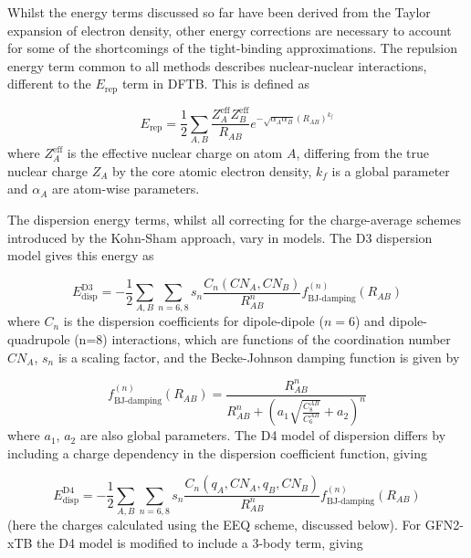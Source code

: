 Whilst the energy terms discussed so far have been derived from the Taylor expansion
of electron density, other energy corrections are necessary to account for some 
of the shortcomings of the tight-binding approximations. The repulsion energy term
common to all methods describes nuclear-nuclear interactions,
different to the $E_{\text{rep}}$ term in DFTB. This is defined as

\begin{equation}
    E_{\text{rep}} = \frac{1}{2}\sum_{A,B} \frac{Z^{\text{eff}}_A Z^{\text{eff}}_B}{R_{AB}} e^{-\sqrt{\alpha_A \alpha_B} \left(R_{AB}\right)^{k_f}}
\end{equation}
%
where $Z^{\text{eff}}_A$ is the effective nuclear charge on atom $A$, differing 
from the true nuclear charge $Z_A$ by the core atomic electron density, $k_f$ is
a global parameter and $\alpha_A$ are atom-wise parameters.

The dispersion energy terms, whilst all correcting for the charge-average schemes
introduced by the Kohn-Sham approach, vary in models. The D3 dispersion model gives
this energy as

\begin{equation}
    E^{\text{D3}}_\text{disp} = -\frac{1}{2}\sum_{A,B}\sum_{n=6,8} s_n \frac{C_n\left(CN_A, CN_B\right)}{R^n_{AB}} f^{\left(n\right)}_{\text{BJ-damping}} \left(R_{AB}\right)
\end{equation}
%
where $C_n$ is the dispersion coefficients for dipole-dipole ($n=6$) and dipole-quadrupole
(n=8) interactions, which are functions of the coordination number $CN_A$, $s_n$
is a scaling factor, and the Becke-Johnson damping function is given by

\begin{equation}
    f^{\left(n\right)}_{\text{BJ-damping}}\left(R_{AB}\right) = \frac{R^n_{AB}}{R^n_{AB} + \left(a_1 \sqrt{\frac{C_8^{AB}}{C_6^{AB}}} + a_2 \right)^n} 
\end{equation}
%
where $a_1$, $a_2$ are also global parameters. The D4 model of dispersion differs
by including a charge dependency in the dispersion coefficient function, giving

\begin{equation}
    E^{\text{D4}}_\text{disp} = -\frac{1}{2}\sum_{A,B}\sum_{n=6,8} s_n \frac{C_n\left(q_A, CN_A, q_B, CN_B\right)}{R^n_{AB}} f^{\left(n\right)}_{\text{BJ-damping}} \left(R_{AB}\right)
\end{equation}
%
(here the charges calculated using the EEQ scheme, discussed below). For GFN2-xTB
the D4 model is modified to include a 3-body term, giving

